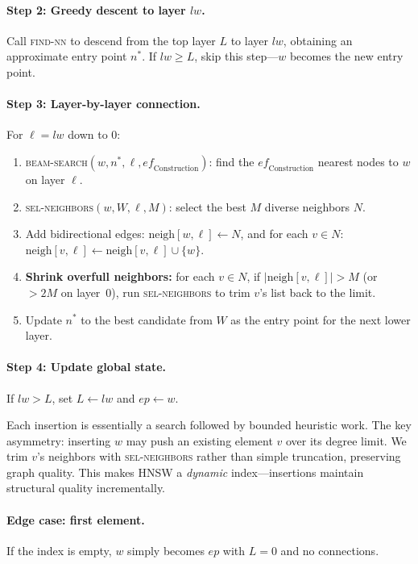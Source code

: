 \documentclass[11pt]{article}
\newcommand{\eps}{\mathit{ep}}
\newcommand{\ef}{\mathit{ef}}
\newcommand{\lw}{\mathit{lw}}
\newcommand{\neigh}{\mathrm{neigh}}
\theoremstyle{definition}
\begin{document}
\paragraph{Step 2: Greedy descent to layer $\lw$.} Call \textsc{find-nn} to descend from the top layer $L$ to layer $\lw$, obtaining an approximate entry point $n^*$. If $\lw \geq L$, skip this step---$w$ becomes the new entry point.

\paragraph{Step 3: Layer-by-layer connection.} For $\ell = \lw$ down to $0$:
\begin{enumerate}
  \item \textsc{beam-search}$(w, n^*, \ell, \ef_{\mathrm{Construction}})$: find the $\ef_{\mathrm{Construction}}$ nearest nodes to $w$ on layer $\ell$.
  \item \textsc{sel-neighbors}$(w, W, \ell, M)$: select the best $M$ diverse neighbors $N$.
  \item Add bidirectional edges: $\neigh[w, \ell] \gets N$, and for each $v \in N$: $\neigh[v, \ell] \gets \neigh[v, \ell] \cup \{w\}$.
  \item \textbf{Shrink overfull neighbors:} for each $v \in N$, if $|\neigh[v, \ell]| > M$ (or $> 2M$ on layer~0), run \textsc{sel-neighbors} to trim $v$'s list back to the limit.
  \item Update $n^*$ to the best candidate from $W$ as the entry point for the next lower layer.
\end{enumerate}

\paragraph{Step 4: Update global state.} If $\lw > L$, set $L \gets \lw$ and $\eps \gets w$.

\begin{intubox}
Each insertion is essentially a search followed by bounded heuristic work. The key asymmetry: inserting $w$ may push an existing element $v$ over its degree limit. We trim $v$'s neighbors with \textsc{sel-neighbors} rather than simple truncation, preserving graph quality. This makes HNSW a \emph{dynamic} index---insertions maintain structural quality incrementally.
\end{intubox}

\paragraph{Edge case: first element.} If the index is empty, $w$ simply becomes $\eps$ with $L = 0$ and no connections.
\end{document}

